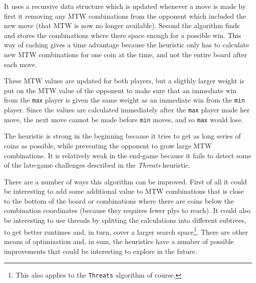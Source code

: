 \documentclass[a4paper, titlepage]{article}
\begin{document}
It uses a recursive data structure which is updated whenever a move is made by first it 
removing any MTW combinations from the opponent which included the new move (that MTW is 
now no longer available). Second the algorithm finds and stores the combinations where 
there space enough for a possible win.
This way of caching gives a time advantage because the heuristic only has to calculate new MTW 
combinations for one coin at the time, and not the entire board after each move.

These MTW values are updated for both players, but a sligthly larger weight is put on the 
MTW value of the opponent to make sure that an immediate win from the \texttt{max} player 
is given the same weight as an immediate win from the \texttt{min} player. Since the values 
are calculated immediately after the \texttt{max} player made her move, the next move cannot
be made before \texttt{min} moves, and so \texttt{max} would lose.

The heuristic is strong in the beginning because it tries to get as long series of coins
as possible, while preventing the opponent to grow large MTW combinations. It is 
relatively weak in the end-game because it fails to detect some of the late-game challenges 
described in the \textit{Threats} heuristic. 

There are a number of ways this algorithm can be improved. First of all it could be
interesting to add some additional value to MTW combinations that is close to the bottom of
the board or combinations where there are coins below the combination coordinates 
(because they requires fewer plys to reach). It could also be interesting to use threads by 
splitting the calculations into different subtrees, to get better runtimes and, in turn,
cover a larger search space\footnote{This also applies to the \texttt{Threats} algorithm
of course.}. There are other means of optimization and, in sum, the heuristics have a 
number of possible improvements that could be interesting to explore in the future.
\end{document}
